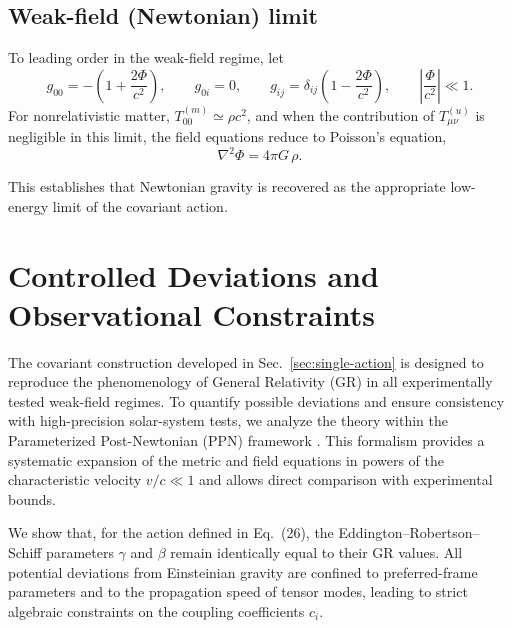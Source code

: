 \documentclass[11pt]{article}
\begin{document}
    \subsection{Weak-field (Newtonian) limit}

        To leading order in the weak-field regime, let
        \begin{equation}
            g_{00} = -\left(1+\frac{2\Phi}{c^2}\right), \qquad
            g_{0i} = 0, \qquad
            g_{ij} = \delta_{ij}\left(1-\frac{2\Phi}{c^2}\right),
            \qquad
            \left|\frac{\Phi}{c^2}\right| \ll 1 .
        \end{equation}
        For nonrelativistic matter, $T^{(m)}_{00} \simeq \rho c^2$, and when the
        contribution of $T^{(u)}_{\mu\nu}$ is negligible in this limit, the field
        equations reduce to Poisson’s equation,
        \begin{equation}
            \nabla^2 \Phi = 4\pi G\,\rho .
        \end{equation}

        This establishes that Newtonian gravity is recovered as the appropriate
        low-energy limit of the covariant action.

    \section{Controlled Deviations and Observational Constraints}
    \label{sec:departures}

    The covariant construction developed in Sec.~\ref{sec:single-action} is designed
    to reproduce the phenomenology of General Relativity (GR) in all experimentally
    tested weak-field regimes.
    To quantify possible deviations and ensure consistency with high-precision
    solar-system tests, we analyze the theory within the Parameterized
    Post-Newtonian (PPN) framework \cite{will2014}.
    This formalism provides a systematic expansion of the metric and field equations
    in powers of the characteristic velocity $v/c \ll 1$ and allows direct
    comparison with experimental bounds.

    We show that, for the action defined in Eq.~(26), the Eddington--Robertson--Schiff
    parameters $\gamma$ and $\beta$ remain identically equal to their GR values.
    All potential deviations from Einsteinian gravity are confined to
    preferred-frame parameters and to the propagation speed of tensor modes,
    leading to strict algebraic constraints on the coupling coefficients $c_i$.
\end{document}
